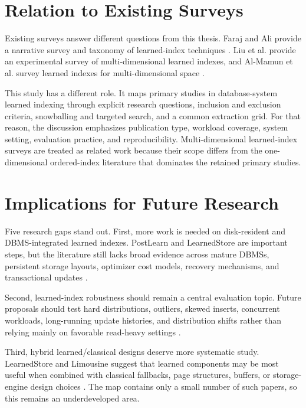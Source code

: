 \documentclass[a4paper, 12pt, twoside]{report}
\begin{document}
\section{Relation to Existing Surveys}

Existing surveys answer different questions from this thesis. Faraj and Ali provide a narrative survey and taxonomy of learned-index techniques \cite{faraj2024survey}. Liu et al. provide an experimental survey of multi-dimensional learned indexes, and Al-Mamun et al. survey learned indexes for multi-dimensional space \cite{liu2025multidimensional,almamun2025survey}.

This study has a different role. It maps primary studies in database-system learned indexing through explicit research questions, inclusion and exclusion criteria, snowballing and targeted search, and a common extraction grid. For that reason, the discussion emphasizes publication type, workload coverage, system setting, evaluation practice, and reproducibility. Multi-dimensional learned-index surveys are treated as related work because their scope differs from the one-dimensional ordered-index literature that dominates the retained primary studies.

\section{Implications for Future Research}

Five research gaps stand out. First, more work is needed on disk-resident and DBMS-integrated learned indexes. PostLearn and LearnedStore are important steps, but the literature still lacks broad evidence across mature DBMSs, persistent storage layouts, optimizer cost models, recovery mechanisms, and transactional updates \cite{maharjan2023learnedstore,fuad2026postlearn}.

Second, learned-index robustness should remain a central evaluation topic. Future proposals should test hard distributions, outliers, skewed inserts, concurrent workloads, long-running update histories, and distribution shifts rather than relying mainly on favorable read-heavy settings \cite{wongkham2022ready,luo2025robustness}.

Third, hybrid learned/classical designs deserve more systematic study. LearnedStore and Limousine suggest that learned components may be most useful when combined with classical fallbacks, page structures, buffers, or storage-engine design choices \cite{maharjan2023learnedstore,chatterjee2024limousine}. The map contains only a small number of such papers, so this remains an underdeveloped area.
\end{document}
